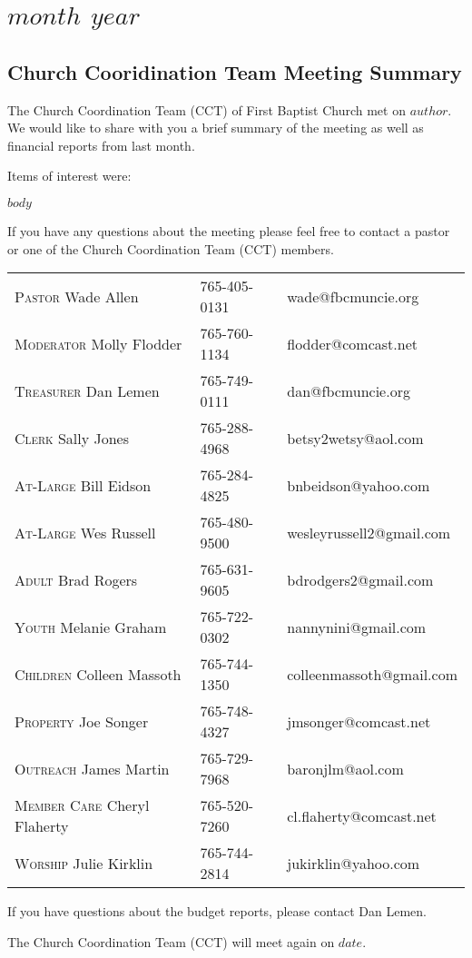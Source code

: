 \documentclass[Letter, 11pt, twoside]{report}
\begin{document}
\part{$month$ $year$}
\chapter{Church Cooridination Team Meeting Summary}

The Church Coordination Team (CCT) of First Baptist Church met on $author$. We would like to share with you a brief summary of the meeting as well as financial reports from last month.

Items of interest were:

$body$

If you have any questions about the meeting please feel free to contact a pastor or one of the Church Coordination Team (CCT) members.

\begin{tabular}{@{}lll}
\textsc{Pastor} Wade Allen & 765-405-0131 & wade@fbcmuncie.org\\
\textsc{Moderator} Molly Flodder & 765-760-1134 & flodder@comcast.net\\
\textsc{Treasurer} Dan Lemen & 765-749-0111 & dan@fbcmuncie.org\\
\textsc{Clerk} Sally Jones & 765-288-4968 & betsy2wetsy@aol.com\\
\textsc{At-Large} Bill Eidson & 765-284-4825 & bnbeidson@yahoo.com \\
\textsc{At-Large} Wes Russell & 765-480-9500 & wesleyrussell2@gmail.com\\
\textsc{Adult} Brad Rogers & 765-631-9605 & bdrodgers2@gmail.com\\
\textsc{Youth} Melanie Graham & 765-722-0302 & nannynini@gmail.com\\
\textsc{Children} Colleen Massoth & 765-744-1350 & colleenmassoth@gmail.com\\
\textsc{Property} Joe Songer & 765-748-4327 & jmsonger@comcast.net\\
\textsc{Outreach} James Martin & 765-729-7968 & baronjlm@aol.com \\
\textsc{Member Care} Cheryl Flaherty & 765-520-7260 & cl.flaherty@comcast.net \\
\textsc{Worship} Julie Kirklin & 765-744-2814 &  jukirklin@yahoo.com \\ 
\end{tabular}

If you have questions about the budget reports, please contact  
Dan Lemen.

The Church Coordination Team (CCT) will meet again on $date$. 




\end{document}
